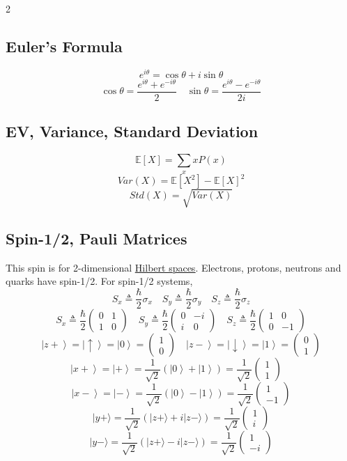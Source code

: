 \documentclass[
]{article}
\let\oldhyperref\hyperref
\renewcommand{\hyperref}[2][]{\oldhyperref[#1]{\underline{#2}}}
\providecommand{\ket}[1]{\left\lvert #1 \right\rangle}
\begin{document}
\begin{multicols}{2}
	\subsection*{Euler's Formula}
	\[
		e^{i\theta} = \cos\theta + i\sin\theta
	\]
	\[
		\cos\theta = \frac{e^{i\theta}+e^{-i\theta}}{2}\quad
		\sin\theta = \frac{e^{i\theta}-e^{-i\theta}}{2i}
	\]
	\subsection*{EV, Variance, Standard Deviation}
	\[
		\mathbb{E}[X] = \sum_x x P(x)
	\]
	\[
		Var(X) = \mathbb{E}[X^2] - \mathbb{E}[X]^2
	\]
	\[
		Std(X) = \sqrt{Var(X)}
	\]

	\subsection*{Spin-1/2, Pauli Matrices}

	This spin is for 2-dimensional \hyperref[hilbert-spaces]{Hilbert spaces}.
	Electrons, protons, neutrons and quarks have spin-1/2.
	For spin-1/2 systems,
	\[
		S_x\triangleq\frac{\hbar}{2}\sigma_x\quad
		S_y\triangleq\frac{\hbar}{2}\sigma_y\quad
		S_z\triangleq\frac{\hbar}{2}\sigma_z
	\]
	\[
		S_x\triangleq\frac{\hbar}{2}\begin{pmatrix}0 & 1\\ 1 & 0\end{pmatrix}\quad
		S_y\triangleq\frac{\hbar}{2}\begin{pmatrix}0 & -i\\ i & 0\end{pmatrix}\quad
		S_z\triangleq\frac{\hbar}{2}\begin{pmatrix}1 & 0\\ 0 & -1\end{pmatrix}
	\]
	\[
		\ket{z+}=\ket{\uparrow} = \ket{0}=\begin{pmatrix}1 \\ 0\end{pmatrix}\quad
		\ket{z-}=\ket{\downarrow} = \ket{1}=\begin{pmatrix}0 \\ 1\end{pmatrix}
	\]
	\[
		\ket{x+}=\ket{+}=\frac{1}{\sqrt{2}}(\ket{0}+\ket{1})=\frac{1}{\sqrt{2}}\begin{pmatrix}1 \\ 1\end{pmatrix}\quad
	\]
	\[
		\ket{x-}=\ket{-}=\frac{1}{\sqrt{2}}(\ket{0}-\ket{1})=\frac{1}{\sqrt{2}}\begin{pmatrix}1 \\ -1\end{pmatrix}
	\]
	\[
		|y+\rangle = \frac{1}{\sqrt{2}}\left(|z+\rangle + i|z-\rangle\right) = \frac{1}{\sqrt{2}}\begin{pmatrix} 1 \\ i \end{pmatrix}
	\]
	\[
		|y-\rangle = \frac{1}{\sqrt{2}}\left(|z+\rangle - i|z-\rangle\right) = \frac{1}{\sqrt{2}}\begin{pmatrix} 1 \\ -i \end{pmatrix}
	\]

\end{multicols}
\end{document}
